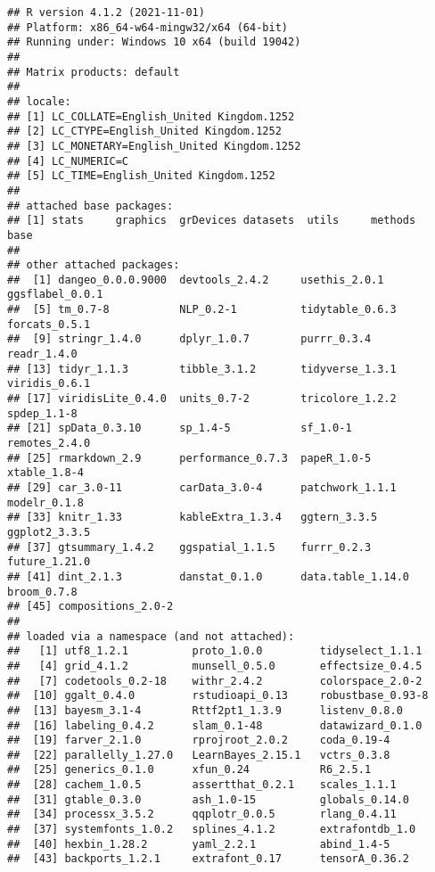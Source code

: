 \documentclass[
  12pt,
]{article}
\begin{document}
\begin{verbatim}
## R version 4.1.2 (2021-11-01)
## Platform: x86_64-w64-mingw32/x64 (64-bit)
## Running under: Windows 10 x64 (build 19042)
## 
## Matrix products: default
## 
## locale:
## [1] LC_COLLATE=English_United Kingdom.1252 
## [2] LC_CTYPE=English_United Kingdom.1252   
## [3] LC_MONETARY=English_United Kingdom.1252
## [4] LC_NUMERIC=C                           
## [5] LC_TIME=English_United Kingdom.1252    
## 
## attached base packages:
## [1] stats     graphics  grDevices datasets  utils     methods   base     
## 
## other attached packages:
##  [1] dangeo_0.0.0.9000  devtools_2.4.2     usethis_2.0.1      ggsflabel_0.0.1   
##  [5] tm_0.7-8           NLP_0.2-1          tidytable_0.6.3    forcats_0.5.1     
##  [9] stringr_1.4.0      dplyr_1.0.7        purrr_0.3.4        readr_1.4.0       
## [13] tidyr_1.1.3        tibble_3.1.2       tidyverse_1.3.1    viridis_0.6.1     
## [17] viridisLite_0.4.0  units_0.7-2        tricolore_1.2.2    spdep_1.1-8       
## [21] spData_0.3.10      sp_1.4-5           sf_1.0-1           remotes_2.4.0     
## [25] rmarkdown_2.9      performance_0.7.3  papeR_1.0-5        xtable_1.8-4      
## [29] car_3.0-11         carData_3.0-4      patchwork_1.1.1    modelr_0.1.8      
## [33] knitr_1.33         kableExtra_1.3.4   ggtern_3.3.5       ggplot2_3.3.5     
## [37] gtsummary_1.4.2    ggspatial_1.1.5    furrr_0.2.3        future_1.21.0     
## [41] dint_2.1.3         danstat_0.1.0      data.table_1.14.0  broom_0.7.8       
## [45] compositions_2.0-2
## 
## loaded via a namespace (and not attached):
##   [1] utf8_1.2.1          proto_1.0.0         tidyselect_1.1.1   
##   [4] grid_4.1.2          munsell_0.5.0       effectsize_0.4.5   
##   [7] codetools_0.2-18    withr_2.4.2         colorspace_2.0-2   
##  [10] ggalt_0.4.0         rstudioapi_0.13     robustbase_0.93-8  
##  [13] bayesm_3.1-4        Rttf2pt1_1.3.9      listenv_0.8.0      
##  [16] labeling_0.4.2      slam_0.1-48         datawizard_0.1.0   
##  [19] farver_2.1.0        rprojroot_2.0.2     coda_0.19-4        
##  [22] parallelly_1.27.0   LearnBayes_2.15.1   vctrs_0.3.8        
##  [25] generics_0.1.0      xfun_0.24           R6_2.5.1           
##  [28] cachem_1.0.5        assertthat_0.2.1    scales_1.1.1       
##  [31] gtable_0.3.0        ash_1.0-15          globals_0.14.0     
##  [34] processx_3.5.2      qqplotr_0.0.5       rlang_0.4.11       
##  [37] systemfonts_1.0.2   splines_4.1.2       extrafontdb_1.0    
##  [40] hexbin_1.28.2       yaml_2.2.1          abind_1.4-5        
##  [43] backports_1.2.1     extrafont_0.17      tensorA_0.36.2     

\end{verbatim}
\end{document}
